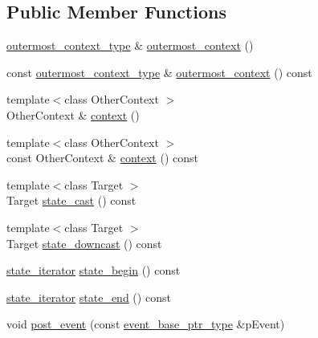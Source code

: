 \subsection*{Public Member Functions}
\begin{DoxyCompactItemize}
\item 
\mbox{\hyperlink{classboost_1_1statechart_1_1simple__state_a25f32527ab9e99c9ae75c723e4be9cb6}{outermost\+\_\+context\+\_\+type}} \& \mbox{\hyperlink{classboost_1_1statechart_1_1simple__state_a5a2e9abf29040c3dd91ac9d98a17f564}{outermost\+\_\+context}} ()
\item 
const \mbox{\hyperlink{classboost_1_1statechart_1_1simple__state_a25f32527ab9e99c9ae75c723e4be9cb6}{outermost\+\_\+context\+\_\+type}} \& \mbox{\hyperlink{classboost_1_1statechart_1_1simple__state_aea19005dfbeaca465dea79c74799544c}{outermost\+\_\+context}} () const
\item 
{\footnotesize template$<$class Other\+Context $>$ }\\Other\+Context \& \mbox{\hyperlink{classboost_1_1statechart_1_1simple__state_ad03964fab8bcfc34742edcf0f5570d92}{context}} ()
\item 
{\footnotesize template$<$class Other\+Context $>$ }\\const Other\+Context \& \mbox{\hyperlink{classboost_1_1statechart_1_1simple__state_ac055c1f205e10fe2d665b68b5038be2a}{context}} () const
\item 
{\footnotesize template$<$class Target $>$ }\\Target \mbox{\hyperlink{classboost_1_1statechart_1_1simple__state_aa94dea47fe6c47cdd5a3585be5db75a0}{state\+\_\+cast}} () const
\item 
{\footnotesize template$<$class Target $>$ }\\Target \mbox{\hyperlink{classboost_1_1statechart_1_1simple__state_aa7af8e560ba3ad0f9d158b9c1188109f}{state\+\_\+downcast}} () const
\item 
\mbox{\hyperlink{classboost_1_1statechart_1_1simple__state_a32d30bbceb41ad02b70016d8530722a1}{state\+\_\+iterator}} \mbox{\hyperlink{classboost_1_1statechart_1_1simple__state_a2884dbeb0cbc4465e5ce1955f1a655e7}{state\+\_\+begin}} () const
\item 
\mbox{\hyperlink{classboost_1_1statechart_1_1simple__state_a32d30bbceb41ad02b70016d8530722a1}{state\+\_\+iterator}} \mbox{\hyperlink{classboost_1_1statechart_1_1simple__state_a831e44d8bb7aa3f0f9a46df96de9099b}{state\+\_\+end}} () const
\item 
void \mbox{\hyperlink{classboost_1_1statechart_1_1simple__state_a67205f8400d43e13a51cfb4a4a382ce5}{post\+\_\+event}} (const \mbox{\hyperlink{classboost_1_1statechart_1_1simple__state_aeea28c41a57acb4507e30ca5adb6016f}{event\+\_\+base\+\_\+ptr\+\_\+type}} \&p\+Event)

\end{DoxyCompactItemize}
